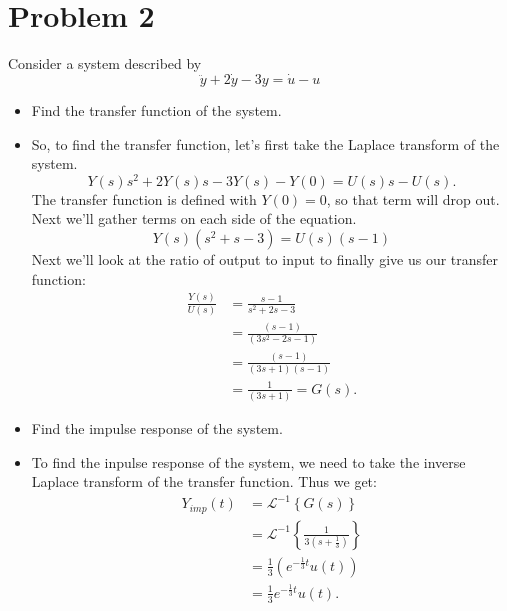 \documentclass[10pt]{article}
\begin{document}


\section{Problem 2}
 Consider a system described by
 \begin{equation}
   \ddot{y} + 2\dot{y}-3y = \dot{u} -u
 \end{equation}
 \begin{itemize}
 \item Find the transfer function of the system.
 \item So, to find the transfer function, let's first take the Laplace
   transform of the system.
   \begin{equation*}
     Y(s)s^2 + 2Y(s)s - 3Y(s) - Y(0) =
     U(s)s - U(s).
   \end{equation*}
The transfer function is defined with $Y(0) = 0$, so that term will
drop out.  Next we'll gather terms on each side of the equation.
\begin{equation*}
  Y(s)\left(s^2 + s - 3\right) =
  U(s)\left(s - 1\right)
\end{equation*}
Next we'll look at the ratio of output to input to finally give us our
transfer function:
\begin{equation*}
\begin{split}
  \frac{Y(s)}{U(s)} &= \frac{s - 1}{s^2 +
    2s - 3} \\
  &=
  \frac{\left(s-1\right)}
       {\left(3s^2-2s-1\right)} \\ 
       &=\frac{(s-1)}{(3s+1)(s-1)}\\
       &= \frac{1}{(3s+1)} = G(s).
\end{split}
\end{equation*}
 \item Find the impulse response of the system.
 \item[] To find the inpulse response of the system, we need to take
   the inverse Laplace transform of the transfer function.
Thus we get:
\begin{equation*}
  \begin{split}
    Y_{imp}(t) &= \mathcal{L}^{-1}\left\{G(s)\right\}\\
    &= \mathcal{L}^{-1}\left\{\frac{1}{3(s+\frac{1}{3})}\right\}\\
    &= \frac{1}{3}\left(e^{-\frac{1}{3}t}u(t)\right) \\
    & = \frac{1}{3}e^{-\frac{1}{3}t}u(t).
  \end{split}
\end{equation*}
 \end{itemize}
\end{document}
